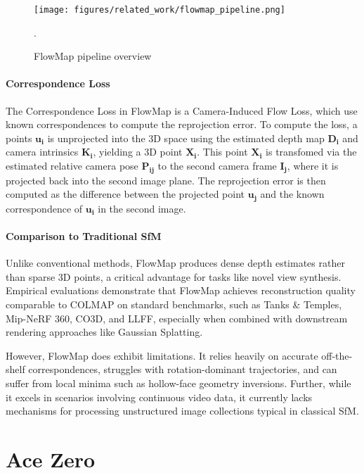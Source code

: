 \begin{figure}[h]
    \centering
    \texttt{[image: figures/related\_work/flowmap\_pipeline.png]}
    \caption{FlowMap pipeline overview \cite{smith24flowmap}}.
    \label{fig:flowmap}
\end{figure}

\paragraph{Correspondence Loss}
The Correspondence Loss in FlowMap is a Camera-Induced Flow Loss, which use known correspondences to compute the reprojection error. 
To compute the loss, a points $\mathbf{u_i}$ is unprojected into the 3D space using the estimated depth map $\mathbf{D_i}$ and camera intrinsics $\mathbf{K_i}$, yielding a 3D point $\mathbf{X_i}$.
This point $\mathbf{X_i}$ is transfomed via the estimated relative camera pose $\mathbf{P_{ij}}$ to the second camera frame $\mathbf{I_j}$, where it is projected back into the second image plane.
The reprojection error is then computed as the difference between the projected point $\mathbf{u_j}$ and the known correspondence of $\mathbf{u_i}$ in the second image.


\paragraph{Comparison to Traditional SfM}
Unlike conventional methods, FlowMap produces dense depth estimates rather than sparse 3D points, a critical advantage for tasks like novel view synthesis. 
Empirical evaluations demonstrate that FlowMap achieves reconstruction quality comparable to COLMAP on standard benchmarks, such as Tanks \& Temples, Mip-NeRF 360, CO3D, and LLFF, especially when combined with downstream rendering approaches like Gaussian Splatting.

However, FlowMap does exhibit limitations. It relies heavily on accurate off-the-shelf correspondences, struggles with rotation-dominant trajectories, and can suffer from local minima such as hollow-face geometry inversions. 
Further, while it excels in scenarios involving continuous video data, it currently lacks mechanisms for processing unstructured image collections typical in classical SfM.

\section{Ace Zero}\label{sec:acezero}

